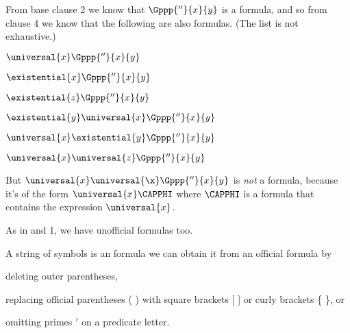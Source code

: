 From base clause 2 we know that $\Gppp{''}{\variable{x}}{\variable{y}}$ is a formula, and so from clause 4 we know that the following are also formulas. 
(The list is not exhaustive.) 
\begin{multicols}{2}
\begin{menumerate}
\item $\universal{\variable{x}}\Gppp{''}{\variable{x}}{\variable{y}}$ 
\item $\existential{\variable{x}}\Gppp{''}{\variable{x}}{\variable{y}}$ 
\item $\existential{\variable{z}}\Gppp{''}{\variable{x}}{\variable{y}}$
\item $\existential{\variable{y}}\universal{\variable{x}}\Gppp{''}{\variable{x}}{\variable{y}}$ 
\item $\universal{\variable{x}}\existential{\variable{y}}\Gppp{''}{\variable{x}}{\variable{y}}$ 
\item $\universal{\variable{x}}\universal{\variable{z}}\Gppp{''}{\variable{x}}{\variable{y}}$ 
\end{menumerate}
\end{multicols}
\noindent{}But $\universal{\variable{x}}\universal{\x}\Gppp{''}{\variable{x}}{\variable{y}}$ is \emph{not} a formula, because it's of the form $\universal{\variable{x}}\CAPPHI$ where $\CAPPHI$ is a formula that contains the expression $\universal{\variable{x}}$.

As in \GSL{} and \GQL{}1, we have unofficial formulas too.
\begin{majorILnc}{}
A string of symbols is an  formula \Iff we can obtain it from an official formula by
\begin{cenumerate}
\item deleting outer parentheses,
\item replacing official parentheses ( ) with square brackets [ ] or curly brackets \{ \}, or
\item omitting primes $'$ on a predicate letter.
\end{cenumerate}
\end{majorILnc}

